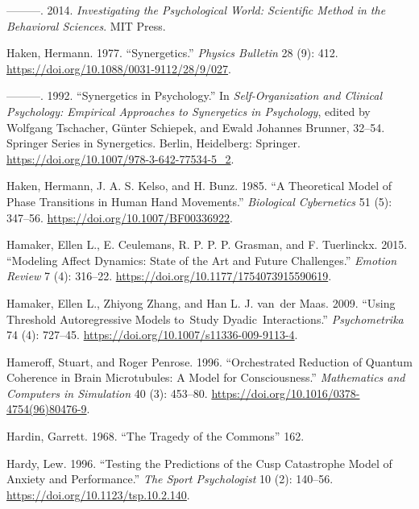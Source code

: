 \documentclass[
  a4paper,
  DIV=11,
  numbers=noendperiod,
  oneside]{scrreprt}
\newlength{\cslhangindent}
\newenvironment{CSLReferences}[2] %
 {\begin{list}{}{%
  \setlength{\itemindent}{0pt}
  \setlength{\leftmargin}{0pt}
  \setlength{\parsep}{0pt}
  \ifodd #1
   \setlength{\leftmargin}{\cslhangindent}
   \setlength{\itemindent}{-1\cslhangindent}
  \fi
  \setlength{\itemsep}{#2\baselineskip}}}
 {\end{list}}
\begin{document}
\begin{CSLReferences}{1}{0}
---------. 2014. \emph{Investigating the {Psychological World}:
{Scientific Method} in the {Behavioral Sciences}}. {MIT Press}.

Haken, Hermann. 1977. {``Synergetics.''} \emph{Physics Bulletin} 28 (9):
412. \url{https://doi.org/10.1088/0031-9112/28/9/027}.

---------. 1992. {``Synergetics in {Psychology}.''} In
\emph{Self-{Organization} and {Clinical Psychology}: {Empirical
Approaches} to {Synergetics} in {Psychology}}, edited by Wolfgang
Tschacher, Günter Schiepek, and Ewald Johannes Brunner, 32--54. Springer
{Series} in {Synergetics}. {Berlin, Heidelberg}: {Springer}.
\url{https://doi.org/10.1007/978-3-642-77534-5_2}.

Haken, Hermann, J. A. S. Kelso, and H. Bunz. 1985. {``A Theoretical
Model of Phase Transitions in Human Hand Movements.''} \emph{Biological
Cybernetics} 51 (5): 347--56. \url{https://doi.org/10.1007/BF00336922}.

Hamaker, Ellen L., E. Ceulemans, R. P. P. P. Grasman, and F. Tuerlinckx.
2015. {``Modeling {Affect Dynamics}: {State} of the {Art} and {Future
Challenges}.''} \emph{Emotion Review} 7 (4): 316--22.
\url{https://doi.org/10.1177/1754073915590619}.

Hamaker, Ellen L., Zhiyong Zhang, and Han L. J. van~der Maas. 2009.
{``Using Threshold Autoregressive Models to~Study
Dyadic~Interactions.''} \emph{Psychometrika} 74 (4): 727--45.
\url{https://doi.org/10.1007/s11336-009-9113-4}.

Hameroff, Stuart, and Roger Penrose. 1996. {``Orchestrated Reduction of
Quantum Coherence in Brain Microtubules: {A} Model for Consciousness.''}
\emph{Mathematics and Computers in Simulation} 40 (3): 453--80.
\url{https://doi.org/10.1016/0378-4754(96)80476-9}.

Hardin, Garrett. 1968. {``The {Tragedy} of the {Commons}''} 162.

Hardy, Lew. 1996. {``Testing the {Predictions} of the {Cusp Catastrophe
Model} of {Anxiety} and {Performance}.''} \emph{The Sport Psychologist}
10 (2): 140--56. \url{https://doi.org/10.1123/tsp.10.2.140}.


\end{CSLReferences}
\end{document}
